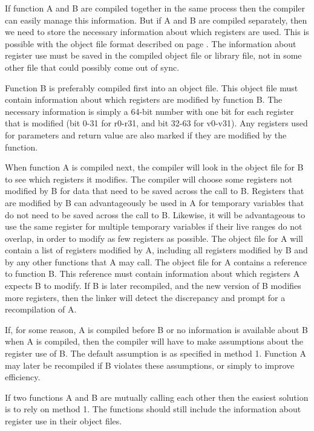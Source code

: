 \documentclass[forwardcom.tex]{subfiles}
\begin{document}
If function A and B are compiled together in the same process then the compiler can easily manage this information. But if A and B are compiled separately, then we need to store the necessary information about which registers are used. This is possible with the object file format described on page \pageref{objectFileFormat}. The information about register use must be saved in the compiled object file or library file, not in some other file that could possibly come out of sync. 
\vspace{2mm}

Function B is preferably compiled first into an object file. This object file must contain information about which registers are modified by function B. The necessary information is simply a 64-bit number with one bit for each register that is modified (bit 0-31 for r0-r31, and bit 32-63 for v0-v31). Any registers used for parameters and return value are also marked if they are modified by the function.
\vspace{2mm}

When function A is compiled next, the compiler will look in the object file for B to see which registers it modifies. The compiler will choose some registers not modified by B for data that need to be saved across the call to B. Registers that are modified by B can advantageously be used in A for temporary variables that do not need to be saved across the call to B. Likewise, it will be advantageous to use the same register for multiple temporary variables if their live ranges do not overlap, in order to modify as few registers as possible. The object file for A will contain a list of registers modified by A, including all registers modified by B and by any other functions that A may call. The object file for A contains a reference to function B. This reference must contain information about which registers A expects B to modify. If B is later recompiled, and the new version of B modifies more registers, then the linker will detect the discrepancy and prompt for a recompilation of A.
\vspace{2mm}

If, for some reason, A is compiled before B or no information is available about B when A is compiled, then the compiler will have to make assumptions about the register use of B. The default assumption is as specified in method 1. Function A may later be recompiled if B violates these assumptions, or simply to improve efficiency. 
\vspace{2mm}

If two functions A and B are mutually calling each other then the easiest solution is to rely on method 1. The functions should still include the information about register use in their object files. 
\vspace{2mm}
\end{document}
